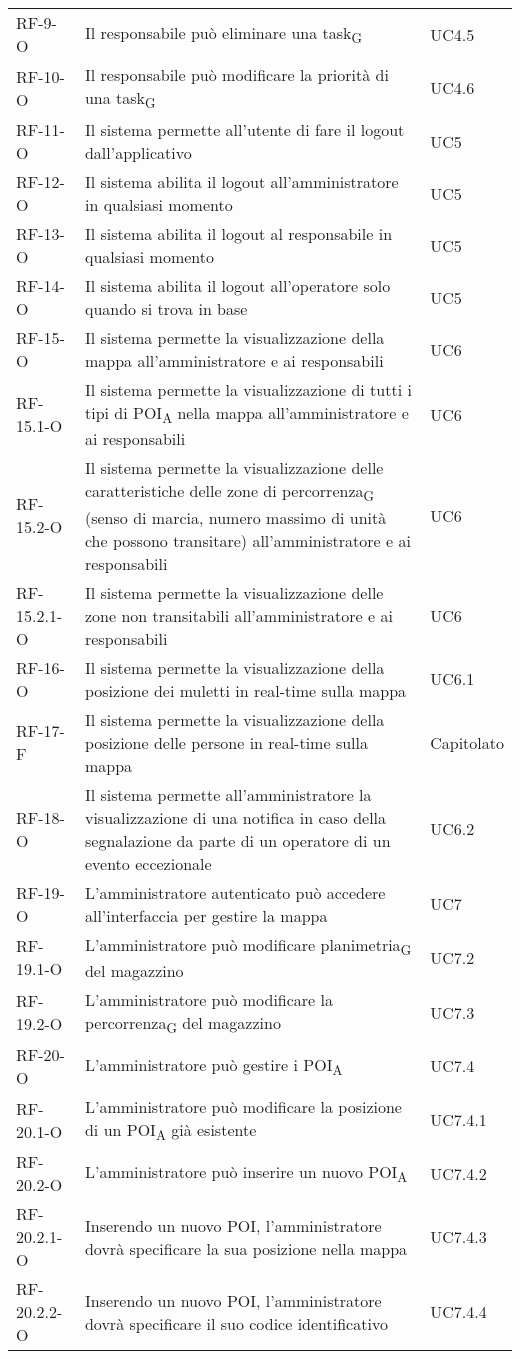 \begin{longtable}{ 
		>{}p{} 
		>{}p{}
		>{\centering}p{} }
RF-9-O		&	Il responsabile può eliminare una \gls{task}\textsubscript{G} 	&	UC4.5\tabularnewline
RF-10-O		&	Il responsabile può modificare la priorità di una \gls{task}\textsubscript{G} 	&	UC4.6\tabularnewline				
RF-11-O		&	Il sistema permette all'utente di fare il logout dall'applicativo	&	UC5\tabularnewline
RF-12-O		&	Il sistema abilita il logout all'amministratore in qualsiasi momento	&	UC5\tabularnewline
RF-13-O		&	Il sistema abilita il logout al responsabile in qualsiasi momento	&	UC5\tabularnewline
RF-14-O		&	Il sistema abilita il logout all'operatore solo quando si trova in base 	&	UC5\tabularnewline				
RF-15-O		&	Il sistema permette la visualizzazione della mappa all'amministratore e ai responsabili	&	UC6\tabularnewline
RF-15.1-O		&	Il sistema permette la visualizzazione di tutti i tipi di \acrshort{POI}\textsubscript{A} nella mappa all'amministratore e ai responsabili	&	UC6\tabularnewline
RF-15.2-O		&	Il sistema permette la visualizzazione delle caratteristiche delle zone di \gls{percorrenza}\textsubscript{G} (senso di marcia, numero massimo di unità che possono transitare) all'amministratore e ai responsabili	& UC6\tabularnewline
RF-15.2.1-O	&	Il sistema permette la visualizzazione delle zone non transitabili all'amministratore e ai responsabili	&	UC6 \tabularnewline
RF-16-O		&	Il sistema permette la visualizzazione della posizione dei muletti in real-time sulla mappa	&	UC6.1\tabularnewline
RF-17-F		&	Il sistema permette la visualizzazione della posizione delle persone in real-time sulla mappa	&	Capitolato\tabularnewline
RF-18-O		&	Il sistema permette all'amministratore la visualizzazione di una notifica in caso della segnalazione da parte di un operatore di un evento eccezionale	&	UC6.2\tabularnewline				
RF-19-O		&	L'amministratore autenticato può accedere all'interfaccia per gestire la mappa 	&	UC7\tabularnewline
RF-19.1-O		&	L'amministratore può modificare \gls{planimetria}\textsubscript{G} del magazzino	&	UC7.2\tabularnewline
RF-19.2-O		&	L'amministratore può modificare la \gls{percorrenza}\textsubscript{G} del magazzino	&	UC7.3\tabularnewline
RF-20-O		&	L'amministratore può gestire i \acrshort{POI}\textsubscript{A}	&	UC7.4\tabularnewline
RF-20.1-O		&	L'amministratore può modificare la posizione di un \acrshort{POI}\textsubscript{A} già esistente	&	UC7.4.1\tabularnewline
RF-20.2-O		&	L'amministratore può inserire un nuovo \acrshort{POI}\textsubscript{A}	&	UC7.4.2\tabularnewline
RF-20.2.1-O	&	Inserendo un nuovo POI, l'amministratore dovrà specificare la sua posizione nella mappa	&	UC7.4.3\tabularnewline
RF-20.2.2-O	&	Inserendo un nuovo POI, l'amministratore dovrà specificare il suo codice identificativo	&	UC7.4.4\tabularnewline

\end{longtable}

